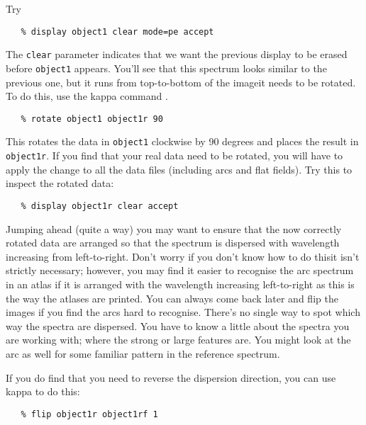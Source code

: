 Try

{
\scspec{\small}{ }
\begin{verbatim}
   % display object1 clear mode=pe accept
\end{verbatim}
}

The \verb+clear+ parameter indicates that we want the previous display to
be erased before \verb+object1+ appears.
You'll see that this spectrum looks similar to the previous one, but it runs
from top-to-bottom of the image\scspec{---}{ - }it needs to be rotated.
To do this, use the {\sc kappa} command .

{
\scspec{\small}{ }
\begin{verbatim}
   % rotate object1 object1r 90
\end{verbatim}
}

This rotates the data in \verb+object1+ clockwise by 90 degrees and places
the result in \verb+object1r+\@.  If you find that your real data need to be
rotated, you will have to apply the change to all the data files (including
arcs and flat fields).  Try this to inspect the rotated data:

{
\scspec{\small}{ }
\begin{verbatim}
   % display object1r clear accept
\end{verbatim}
}

Jumping ahead (quite a way) you may want to ensure that the now correctly
rotated data are arranged so that the spectrum is dispersed with wavelength
increasing from left-to-right.  Don't worry if you don't know how to do
this\scspec{---}{ - }it isn't strictly necessary; however, you may find it
easier to recognise the arc spectrum in an atlas if it is arranged with the
wavelength increasing left-to-right as this is the way the atlases are
printed.
You can always come back later and flip the images if you find the arcs hard
to recognise.
There's no single way to spot which way the spectra are dispersed.
You have to know a little about the spectra you are working with;
where the strong or large features are.  You might look at the arc as
well for some familiar pattern in the reference spectrum.

If you do find that you need to reverse the dispersion direction, you can use
{\sc kappa}  to do this:

{
\scspec{\small}{ }
\begin{verbatim}
   % flip object1r object1rf 1
\end{verbatim}
}

